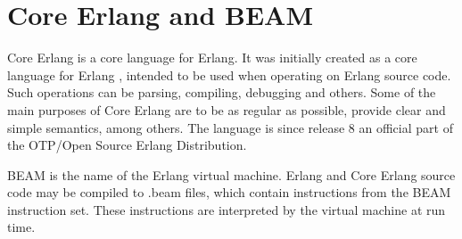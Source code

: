 \section{Core Erlang and BEAM}


Core Erlang \cite{CoreErlangIntro} is a core language for Erlang. It was initially created as a core language for Erlang  , intended to be used when operating on Erlang source code. Such operations can be parsing, compiling, debugging and others. Some of the main purposes of Core Erlang are to be as regular as possible, provide clear and simple semantics, among others. The language is since release 8 an official part of the OTP/Open Source Erlang Distribution. 

BEAM is the name of the Erlang virtual machine. Erlang and Core Erlang source code may be compiled to .beam files, which contain instructions from the BEAM instruction set. These instructions are interpreted by the virtual machine at run time.